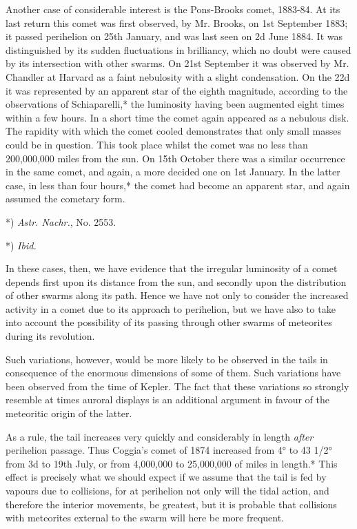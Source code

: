 \documentclass[a4paper, 12pt, oneside, polutonikogreek, english]{article}
\begin{document}
Another case of considerable interest is the Pons-Brooks comet, 1883-84. At its last return this comet was first observed, by Mr. Brooks, on 1st September 1883; it passed perihelion on 25th January, and was last seen on 2d June 1884. It was distinguished by its sudden fluctuations in brilliancy, which no doubt were caused by its intersection with other swarms. On 21st September it was observed by Mr. Chandler at Harvard as a faint nebulosity with a slight condensation. On the 22d it was represented by an apparent star of the eighth magnitude, according to the observations of Schiaparelli,* the luminosity having been augmented eight times within a few hours. In a short time the comet again appeared as a nebulous disk. The rapidity with which the comet cooled demonstrates that only small masses could be in question. This took place whilst the comet was no less than 200,000,000 miles from the sun. On 15th October there was a similar occurrence in the same comet, and again, a more decided one on 1st January. In the latter case, in less than four hours,* the comet had become an apparent star, and again assumed the cometary form.

*) \emph{Astr. Nachr.}, No. 2553.

*) \emph{Ibid.}

In these cases, then, we have evidence that the irregular luminosity of a comet depends first upon its distance from the sun, and secondly upon the distribution of other swarms along its path. Hence we have not only to consider the increased activity in a comet due to its approach to perihelion, but we have also to take into account the possibility of its passing through other swarms of meteorites during its revolution.

Such variations, however, would be more likely to be observed in the tails in consequence of the enormous dimensions of some of them. Such variations have been observed from the time of Kepler. The fact that these variations so strongly resemble at times auroral displays is an additional argument in favour of the meteoritic origin of the latter.

As a rule, the tail increases very quickly and considerably in length \emph{after} perihelion passage. Thus Coggia's comet of 1874 increased from 4° to 43 1/2° from 3d to 19th July, or from 4,000,000 to 25,000,000 of miles in length.* This effect is precisely what we should expect if we assume that the tail is fed by vapours due to collisions, for at perihelion not only will the tidal action, and therefore the interior movements, be greatest, but it is probable that collisions with meteorites external to the swarm will here be more frequent.
\end{document}
